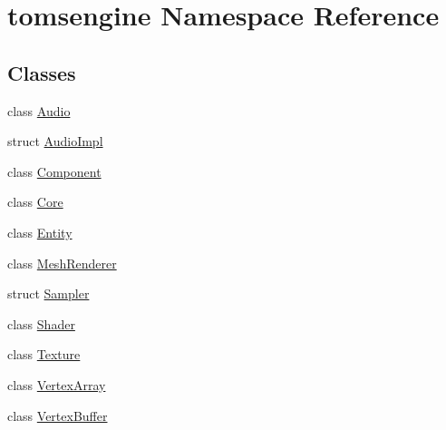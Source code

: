 \hypertarget{namespacetomsengine}{}\section{tomsengine Namespace Reference}
\label{namespacetomsengine}
\subsection*{Classes}
\begin{DoxyCompactItemize}
\item 
class \mbox{\hyperlink{classtomsengine_1_1_audio}{Audio}}
\item 
struct \mbox{\hyperlink{structtomsengine_1_1_audio_impl}{Audio\+Impl}}
\item 
class \mbox{\hyperlink{classtomsengine_1_1_component}{Component}}
\item 
class \mbox{\hyperlink{classtomsengine_1_1_core}{Core}}
\item 
class \mbox{\hyperlink{classtomsengine_1_1_entity}{Entity}}
\item 
class \mbox{\hyperlink{classtomsengine_1_1_mesh_renderer}{Mesh\+Renderer}}
\item 
struct \mbox{\hyperlink{structtomsengine_1_1_sampler}{Sampler}}
\item 
class \mbox{\hyperlink{classtomsengine_1_1_shader}{Shader}}
\item 
class \mbox{\hyperlink{classtomsengine_1_1_texture}{Texture}}
\item 
class \mbox{\hyperlink{classtomsengine_1_1_vertex_array}{Vertex\+Array}}
\item 
class \mbox{\hyperlink{classtomsengine_1_1_vertex_buffer}{Vertex\+Buffer}}
\end{DoxyCompactItemize}
